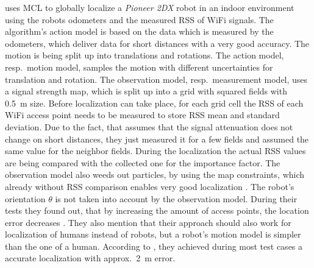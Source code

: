 \citep{siddiqi:experiments_mcl_wifi} uses \acs{MCL} to globally localize a \emph{Pioneer 2DX} robot in an indoor environment using the robots odometers and the measured \acs{RSS} of WiFi signals. The algorithm's action model is based on the data which is measured by the odometers, which deliver data for short distances with a very good accuracy. The motion is being split up into translations and rotations. The action model, resp.\ motion model, samples the motion with different uncertainties for translation and rotation. The observation model, resp.\ measurement model, uses a signal strength map, which is split up into a grid with squared fields with 0.5~m size. Before localization can take place, for each grid cell the \acs{RSS} of each WiFi access point needs to be measured to store \acs{RSS} mean and standard deviation. Due to the fact, that \citet{siddiqi:experiments_mcl_wifi} assumes that the signal attenuation does not change on short distances, they just measured it for a few fields and assumed the same value for the neighbor fields. During the localization the actual \acs{RSS} values are being compared with the collected one for the importance factor. The observation model also weeds out particles, by using the map constraints, which already without \acs{RSS} comparison enables very good localization \citep{siddiqi:experiments_mcl_wifi}. The robot's orientation $\theta$ is not taken into account by the observation model.
During their tests they found out, that by increasing the amount of access points, the location error decreases \citep{siddiqi:experiments_mcl_wifi}. They also mention that their approach should also work for localization of humans instead of robots, but a robot's motion model is simpler than the one of a human. According to \citet{siddiqi:experiments_mcl_wifi}, they achieved during most test cases a accurate localization with approx.\ 2~m error.





